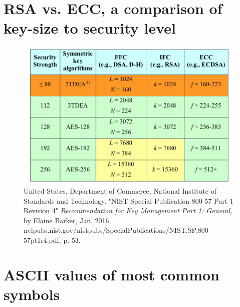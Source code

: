 \documentclass[a4paper,12pt]{article}
\theoremstyle{definition}
\begin{document}
\section{RSA vs. ECC, a comparison of key-size to security level} 
\begin{figure}[h]
	\captionsetup{labelformat=empty}
	\caption{United States, Department of Commerce, National Institute of Standards and Technology. "NIST Special Publication 800-57 Part 1 Revision 4" \textit{Recommendation for Key Management Part 1: General,} by Elaine Barker, Jan. 2016, nvlpubs.nist.gov/nistpubs/SpecialPublications/NIST.SP.800-57pt1r4.pdf, p. 53.}
	\centering
	\includegraphics[width=0.9\linewidth]{rsavsecc}
\end{figure}

\newpage
\section{ASCII values of most common symbols} \label{app:ascii}
\end{document}
